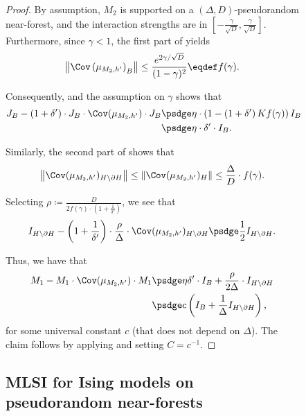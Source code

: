 \documentclass[11pt,letterpaper]{article}
\begin{document}
\begin{figure}
\begin{proof}
        By assumption, $M_2$ is supported on a $(\Delta, D)$-pseudorandom near-forest, and the interaction strengths are in $\left[ -\frac{\gamma}{\sqrt{D}} , \frac{\gamma}{\sqrt{D}} \right]$. Furthermore, since $\gamma < 1$, the first part of  yields
        \begin{align*}
            \left\| \Cov\left( \mu_{M_2,h'} \right)_B \right\| \le \frac{e^{2\gamma/\sqrt{D}}}{(1-\gamma)^2} \eqdef f(\gamma).
        \end{align*}

        Consequently,  and the assumption on $\gamma$ shows that
        \begin{align*}
             J_B - \left( 1 + \delta' \right) \cdot J_B \cdot \Cov(\mu_{M_2,h'}) \cdot J_B &\psdge \eta \cdot \left(1 - \left( 1 + \delta' \right) K f(\gamma)\right) I_B  \\
             &\psdge \eta \cdot \delta' \cdot I_B.
        \end{align*}

        Similarly, the second part of  shows that
        \[ 
            \left\|\Cov(\mu_{M_2,h'})_{H \setminus \partial H}\right\| \le \left\|\Cov(\mu_{M_2,h'})_{H}\right\| \le \frac{\Delta}{D} \cdot f(\gamma).
        \]
        
        Selecting $\rho \coloneqq \frac{D}{2 f(\gamma) \cdot \left( 1 + \frac{1}{\delta'} \right)}$, we see that
        \[ 
            I_{H \setminus \partial H} - \left(1 + \frac{1}{\delta'}\right) \cdot \frac{\rho}{\Delta} \cdot \Cov(\mu_{M_2,h'})_{H \setminus \partial H} \psdge \frac{1}{2} I_{H \setminus \partial H}.
         \]
        
        Thus, we have that
        \begin{align*}
            M_1 - M_1 \cdot \Cov(\mu_{M_2,h'}) \cdot M_1 &\psdge \eta \delta' \cdot  I_B + \frac{\rho}{2\Delta} \cdot I_{H \setminus \partial H} \\
            &\psdge c\left(I_B + \frac{1}{\Delta}I_{H \setminus \partial H}\right),
        \end{align*}
        for some universal constant $c$ (that does not depend on $\Delta$).
        The claim follows by applying  and setting $C = c^{-1}$. 
    \end{proof}

\subsection{MLSI for Ising models on pseudorandom near-forests}
\label{sec:mlsi-tree-ising}


\end{figure}
\end{document}
